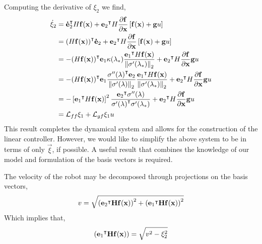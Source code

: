\documentclass[oneside, 11pt]{book}
\begin{document}
Computing the derivative of $\xi_2$ we find,
\begin{align*}
    \dot{\xi}_2 &=  {\mathbf{\dot{e}}_2}^{\intercal}H\mathbf{f}(\mathbf{x})
                    +
                    {\mathbf{e}_2}^{\intercal}H\frac{\partial\mathbf{f}}{\partial\mathbf{x}}\left[\mathbf{f}(\mathbf{x}) + \mathbf{g}u\right]\\
                &=  {(H\mathbf{f}(\mathbf{x}))}^{\intercal}\mathbf{\dot{e}}_2
                    +
                    {\mathbf{e}_2}^{\intercal}H\frac{\partial\mathbf{f}}{\partial\mathbf{x}}\left[\mathbf{f}(\mathbf{x}) + \mathbf{g}u\right]\\
                &=  -{(H\mathbf{f}(\mathbf{x}))}^{\intercal}\mathbf{e}_1 \kappa(\lambda_*)\frac{{\mathbf{e}_1}^{\intercal}H\mathbf{f}(\mathbf{x})}{\left\|\sigma'(\lambda_*)\right\|_2}
                    +
                    {\mathbf{e}_2}^{\intercal}H\frac{\partial\mathbf{f}}{\partial\mathbf{x}}\mathbf{g} u\\
                &=  -{(H\mathbf{f}(\mathbf{x}))}^{\intercal}\mathbf{e}_1 \frac{{\sigma''(\lambda)}^{\intercal}\mathbf{e}_2}{\left\|\sigma'(\lambda)\right\|_2}\frac{{\mathbf{e}_1}^{\intercal}H\mathbf{f}(\mathbf{x})}{\left\|\sigma'(\lambda_*)\right\|_2}
                    +
                    {\mathbf{e}_2}^{\intercal}H\frac{\partial\mathbf{f}}{\partial\mathbf{x}}\mathbf{g} u\\
                &=  -\left[{\mathbf{e}_1}^{\intercal}H\mathbf{f}(\mathbf{x})\right]^2 \frac{{\mathbf{e}_2}^{\intercal}\sigma''(\lambda)}{{\sigma'(\lambda)}^{\intercal}\sigma'(\lambda_*)}
                    +
                    {\mathbf{e}_2}^{\intercal}H\frac{\partial\mathbf{f}}{\partial\mathbf{x}}\mathbf{g} u\\
                &=  \mathcal{L}_{ff}\xi_1 + \mathcal{L}_{gf}\xi_1 u
\end{align*}
This result completes the dynamical system and allows for the construction of the linear controller. However, we would like to simplify the above system to be in terms of only $\vec{\xi}$, if possible. A useful result that combines the knowledge of our model and formulation of the basis vectors is required.
\begin{lemma}
    The velocity of the robot may be decomposed through projections on the basis vectors,
    $$
        v = \sqrt{ \left({\mathbf{e}_2}^{\intercal}\mathbf{H}\mathbf{f}(\mathbf{x})\right)^2 + \left({\mathbf{e}_1}^{\intercal}\mathbf{H}\mathbf{f}(\mathbf{x})\right)^2 }
    $$
    Which implies that,
    $$
        \left({\mathbf{e}_1}^{\intercal}\mathbf{H}\mathbf{f}(\mathbf{x})\right) = \sqrt{v^2 - \xi_2^2}
    $$
\end{lemma}
\end{document}
